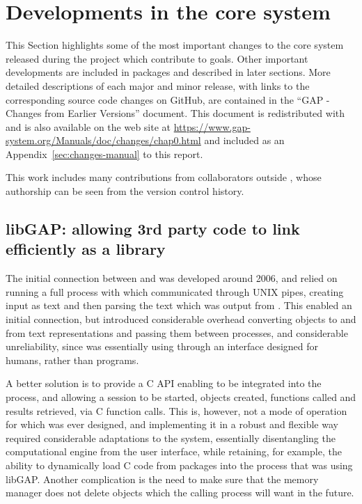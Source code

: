 \section{Developments in the core \GAP system}\label{sec:core-gap}

This Section highlights some of the most important
changes to the core \GAP system released
during the project which contribute to \ODK goals. Other important developments are
included in \GAP packages and described in later sections.  More
detailed descriptions of each major and minor \GAP release, with links
to the corresponding source code changes on GitHub, are contained in
the ``GAP - Changes from Earlier Versions'' document. This document is
redistributed with \GAP and is also available on the \GAP web site at
\url{https://www.gap-system.org/Manuals/doc/changes/chap0.html} and
included as an Appendix~\ref{sec:changes-manual} to this report.

This work includes many contributions from collaborators outside \ODK,
whose authorship can be seen from the version control history.

\subsection{libGAP: allowing 3rd party code to link \GAP efficiently as a library}\label{libgap}

The initial connection between \Sage and \GAP was developed around
2006, and relied on running a full \GAP process with which \Sage
communicated through UNIX pipes, creating \GAP input as text and then parsing
the text which was output from \GAP. This enabled an initial connection, but
introduced considerable overhead converting objects to and from text
representations and passing them between processes, and considerable
unreliability, since \Sage was essentially using \GAP through an
interface designed for humans, rather than programs.

A better solution is to provide a C API enabling \GAP to be integrated
into the \Sage process, and allowing a \GAP session to be started,
objects created, functions called and results retrieved, via C function
calls. This is, however, not a mode of operation for which \GAP was
ever designed, and implementing it in a robust and flexible way
required considerable adaptations to the system, essentially
disentangling the computational engine from the user interface, while retaining,
for example, the ability to dynamically load C code from \GAP
packages into the process that was using libGAP. Another complication
is the need to make sure that the \GAP memory manager does not delete
objects which the calling process will want in the future.

